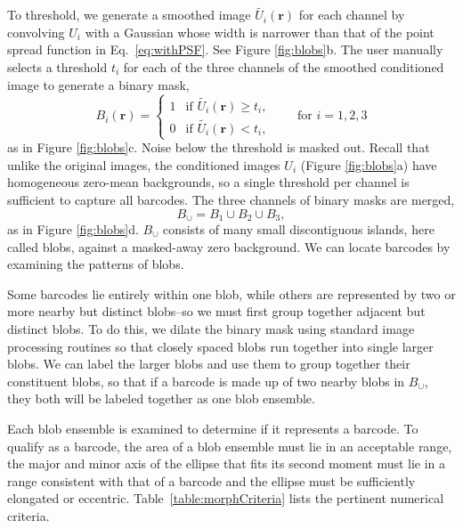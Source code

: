  To threshold, we generate a smoothed image $\tilde{U_i}(\mathbf{r})$ for each channel by convolving $U_i$ with a Gaussian whose width is narrower than that of the point spread function in Eq.~\ref{eq:withPSF}. See  Figure \ref{fig:blobs}b. The user manually selects a threshold $t_i$ for each of the three channels of the smoothed conditioned image to generate a binary mask,
\begin{equation}
	B_i(\mathbf{r}) = \left\{
	\begin{array}{rl}
		 1 & \text{if } \tilde{U_i}(\mathbf{r}) \geq t_i,\\
		 0 & \text{if } \tilde{U_i}(\mathbf{r}) < t_i,
	\end{array} \right. \qquad\text{for } i=1,2,3
\end{equation}
as in Figure \ref{fig:blobs}c. Noise below the threshold is masked out. Recall that unlike the original images, the conditioned images $U_i$  (Figure \ref{fig:blobs}a) have homogeneous zero-mean  backgrounds, so a single threshold per channel is sufficient to capture all barcodes. The three channels of binary masks are merged, 
\begin{equation}
B_{\cup}=B_1\cup B_2 \cup B_3, 
\end{equation}
as in Figure \ref{fig:blobs}d. $B_\cup$ consists of many small discontiguous islands, here called blobs, against a masked-away zero background.  We can locate barcodes by examining the patterns of blobs.

Some barcodes lie entirely within one blob, while others are represented by two or more nearby but distinct blobs--so we must first  group together adjacent but distinct blobs.  To do this, we dilate the binary mask using standard image processing routines \citep{matlab_version_2010} so that closely spaced blobs run together into single larger blobs. We can label the larger blobs and use them to group together their constituent blobs, so that if a barcode is made up of two nearby blobs in $B_\cup$, they both will be labeled together as one blob ensemble.

Each blob ensemble is examined to determine if it represents a barcode. To qualify as a barcode, the area of a blob ensemble must lie in an acceptable range, the major and minor axis of the ellipse that fits its second moment must lie in a range consistent with that of a barcode and the ellipse must be sufficiently elongated or eccentric. Table~\ref{table:morphCriteria} lists the pertinent numerical criteria. 

